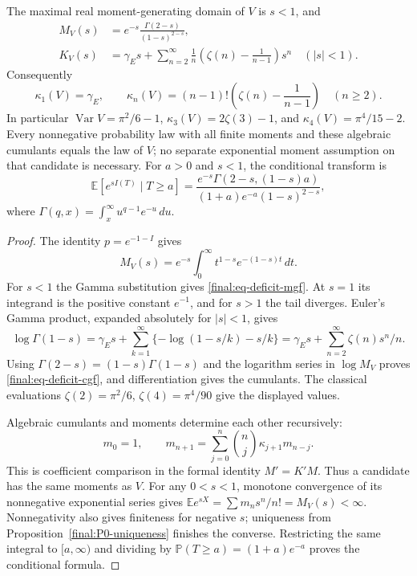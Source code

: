 \begin{proposition}
\label{final:P4-cumulants}
The maximal real moment-generating domain of $V$ is $s<1$, and
\begin{align}
 M_V(s)&=e^{-s}\frac{\Gamma(2-s)}{(1-s)^{2-s}},\label{final:eq-deficit-mgf}\\
 K_V(s)&=\gamma_Es+
 \sum_{n=2}^\infty\frac{1}{n}
       \left(\zeta(n)-\frac{1}{n-1}\right)s^n\quad(|s|<1).
       \label{final:eq-deficit-cgf}
\end{align}
Consequently
\begin{equation}
 \kappa_1(V)=\gamma_E,\qquad
 \kappa_n(V)=(n-1)!
       \left(\zeta(n)-\frac{1}{n-1}\right)\quad(n\geq2).
       \label{final:eq-deficit-cumulants}
\end{equation}
In particular $\operatorname{Var}V=\pi^2/6-1$,
$\kappa_3(V)=2\zeta(3)-1$, and $\kappa_4(V)=\pi^4/15-2$.
Every nonnegative probability law with all finite moments and these
algebraic cumulants equals the law of $V$; no separate exponential
moment assumption on that candidate is necessary.
For $a>0$ and $s<1$, the conditional transform is
\begin{equation}
 \mathbb E[e^{sI(T)}\mid T\geq a]
 =\frac{e^{-s}\Gamma(2-s,(1-s)a)}
       {(1+a)e^{-a}(1-s)^{2-s}},
 \label{final:eq-deficit-truncation}
\end{equation}
where $\Gamma(q,x)=\int_x^\infty u^{q-1}e^{-u}\,du$.
\end{proposition}
\begin{proof}
The identity $p=e^{-1-I}$ gives
\[
 M_V(s)=e^{-s}\int_0^\infty t^{1-s}e^{-(1-s)t}\,dt.
\]
For $s<1$ the Gamma substitution gives
\eqref{final:eq-deficit-mgf}.  At $s=1$ its integrand is the
positive constant $e^{-1}$, and for $s>1$ the tail diverges.
Euler's Gamma product, expanded absolutely for $|s|<1$, gives
\[
 \log\Gamma(1-s)=\gamma_Es+
 \sum_{k=1}^\infty\{-\log(1-s/k)-s/k\}
 =\gamma_Es+\sum_{n=2}^\infty\zeta(n)s^n/n.
\]
Using $\Gamma(2-s)=(1-s)\Gamma(1-s)$ and the logarithm series
in $\log M_V$ proves \eqref{final:eq-deficit-cgf}, and differentiation
gives the cumulants.  The classical evaluations
$\zeta(2)=\pi^2/6$, $\zeta(4)=\pi^4/90$ give the displayed values.

Algebraic cumulants and moments determine each other recursively:
\[
 m_0=1,\qquad
 m_{n+1}=\sum_{j=0}^n\binom nj\kappa_{j+1}m_{n-j}.
\]
This is coefficient comparison in the formal identity $M'=K'M$.
Thus a candidate has the same moments as $V$.  For any $0<s<1$,
monotone convergence of its nonnegative exponential series gives
$\mathbb E e^{sX}=\sum m_ns^n/n!=M_V(s)<\infty$.
Nonnegativity also gives finiteness for negative $s$; uniqueness
from Proposition~\ref{final:P0-uniqueness} finishes the converse.
Restricting the same integral to $[a,\infty)$ and dividing by
$\mathbb P(T\geq a)=(1+a)e^{-a}$ proves the conditional formula.
\end{proof}

